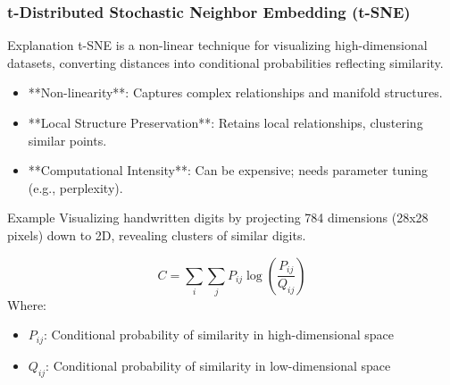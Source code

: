 \documentclass[aspectratio=169]{beamer}
\begin{document}
\begin{frame}[fragile]
    \frametitle{t-Distributed Stochastic Neighbor Embedding (t-SNE)}
    
    \begin{block}{Explanation}
        t-SNE is a non-linear technique for visualizing high-dimensional datasets, converting distances into conditional probabilities reflecting similarity.
    \end{block}
    
    \begin{itemize}
        \item **Non-linearity**: Captures complex relationships and manifold structures.
        \item **Local Structure Preservation**: Retains local relationships, clustering similar points.
        \item **Computational Intensity**: Can be expensive; needs parameter tuning (e.g., perplexity).
    \end{itemize}

    \begin{block}{Example}
        Visualizing handwritten digits by projecting 784 dimensions (28x28 pixels) down to 2D, revealing clusters of similar digits.
    \end{block}

    \begin{equation}
        C = \sum_{i} \sum_{j} P_{ij} \log\left(\frac{P_{ij}}{Q_{ij}}\right)
    \end{equation}
    Where:
    \begin{itemize}
        \item $P_{ij}$: Conditional probability of similarity in high-dimensional space
        \item $Q_{ij}$: Conditional probability of similarity in low-dimensional space
    \end{itemize}
\end{frame}
\end{document}
